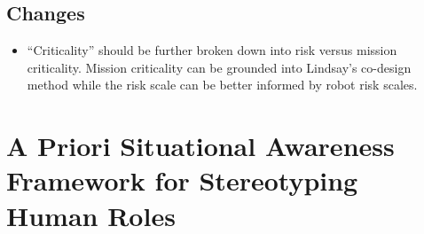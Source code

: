 \documentclass[letterpaper, 10 pt, conference]{ieeeconf}  %
\theoremstyle{definition}
\begin{document}
\subsection{Changes}
\begin{itemize}{}
  \item ``Criticality'' should be further broken down into risk versus mission
    criticality. Mission criticality can be grounded into Lindsay's co-design
    method while the risk scale can be better informed by robot risk scales.
\end{itemize}

\section{A Priori Situational Awareness Framework for Stereotyping Human Roles}
\end{document}
